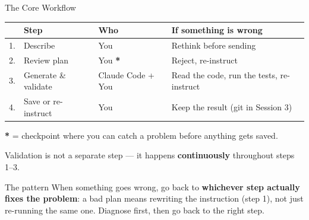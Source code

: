 \documentclass[aspectratio=169, 11pt]{beamer}
\begin{document}
\begin{frame}{The Core Workflow}
  \begin{tabular}{clll}
    & \textbf{Step} & \textbf{Who} & \textbf{If something is wrong} \\[0.2em]
    \toprule
    1. & Describe & You & Rethink before sending \\[0.3em]
    2. & Review plan & You \textcolor{accent}{\textbf{*}} & Reject, re-instruct \\[0.3em]
    3. & Generate \& validate & Claude Code + You & Read the code, run the tests, re-instruct \\[0.3em]
    4. & Save or re-instruct & You & Keep the result (git in Session 3) \\
    \bottomrule
  \end{tabular}

  \vspace{0.8em}
  \textcolor{accent}{\textbf{*}} = checkpoint where you can catch a problem before anything gets saved.

  \vspace{0.3em}
  Validation is not a separate step --- it happens \textbf{continuously} throughout steps 1--3.

  \vspace{0.3em}
  \begin{block}{The pattern}
    When something goes wrong, go back to \textbf{whichever step actually fixes the problem}: a bad plan means rewriting the instruction (step 1), not just re-running the same one. Diagnose first, then go back to the right step.
  \end{block}
\end{frame}
\end{document}
